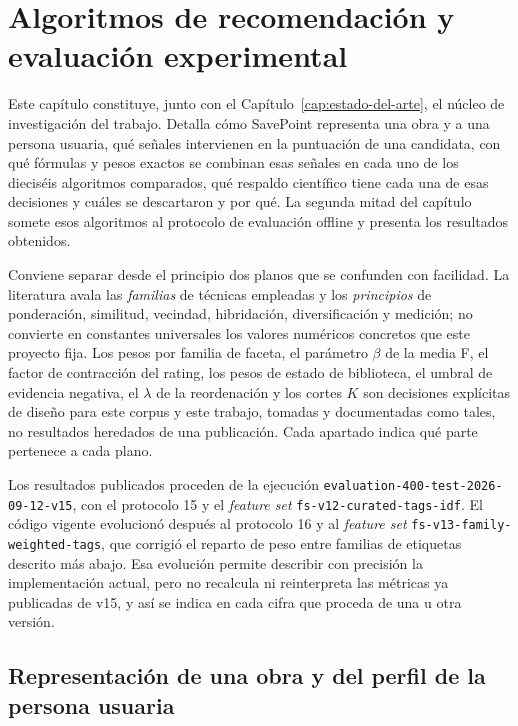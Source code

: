 \chapter{Algoritmos de recomendación y evaluación experimental}\label{cap:algoritmos}\label{cap:nucleo-investigacion}

Este capítulo constituye, junto con el Capítulo~\ref{cap:estado-del-arte}, el núcleo de
investigación del trabajo. Detalla cómo SavePoint representa una obra y a una persona usuaria,
qué señales intervienen en la puntuación de una candidata, con qué fórmulas y pesos exactos se
combinan esas señales en cada uno de los dieciséis algoritmos comparados, qué respaldo
científico tiene cada una de esas decisiones y cuáles se descartaron y por qué. La segunda
mitad del capítulo somete esos algoritmos al protocolo de evaluación offline y presenta los
resultados obtenidos.

Conviene separar desde el principio dos planos que se confunden con facilidad. La literatura
avala las \emph{familias} de técnicas empleadas y los \emph{principios} de ponderación,
similitud, vecindad, hibridación, diversificación y medición; no convierte en constantes
universales los valores numéricos concretos que este proyecto fija. Los pesos por familia de
faceta, el parámetro \(\beta\) de la media F, el factor de contracción del rating, los pesos de
estado de biblioteca, el umbral de evidencia negativa, el \(\lambda\) de la reordenación y los
cortes \(K\) son decisiones explícitas de diseño para este corpus y este trabajo, tomadas y
documentadas como tales, no resultados heredados de una publicación. Cada apartado indica qué
parte pertenece a cada plano.

Los resultados publicados proceden de la ejecución \texttt{evaluation-400-test-2026-09-12-v15},
con el protocolo 15 y el \textit{feature set} \texttt{fs-v12-curated-tags-idf}. El código
vigente evolucionó después al protocolo 16 y al \textit{feature set}
\texttt{fs-v13-family-weighted-tags}, que corrigió el reparto de peso entre familias de
etiquetas descrito más abajo. Esa evolución permite describir con precisión la implementación
actual, pero no recalcula ni reinterpreta las métricas ya publicadas de v15, y así se indica en
cada cifra que proceda de una u otra versión.

\section{Representación de una obra y del perfil de la persona usuaria}\label{sec:alg-representacion}

